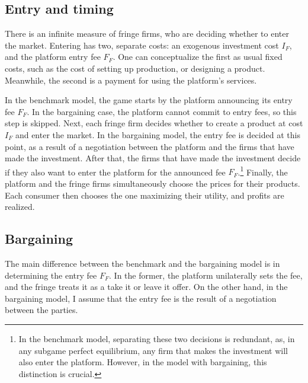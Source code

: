 \documentclass[a4paper]{article}
\begin{document}
\subsection{Entry and timing}

There is an infinite measure of fringe firms, who are deciding whether to enter the market.
Entering has two, separate costs: an exogenous investment cost $I_F$, and the platform entry fee $F_F$.
One can conceptualize the first as usual fixed costs, such as the cost of setting up production, or designing a product.
Meanwhile, the second is a payment for using the platform's services.

In the benchmark model, the game starts by the platform announcing its entry fee $F_F$.
In the bargaining case, the platform cannot commit to entry fees, so this step is skipped.
Next, each fringe firm decides whether to create a product at cost $I_F$ and enter the market.
In the bargaining model, the entry fee is decided at this point, as a result of a negotiation between the platform and the firms that have made the investment.
After that, the firms that have made the investment decide if they also want to enter the platform for the announced fee $F_F$.\footnote{
    In the benchmark model, separating these two decisions is redundant, as, in any subgame perfect equilibrium, any firm that makes the investment will also enter the platform.
    However, in the model with bargaining, this distinction is crucial.
}
Finally, the platform and the fringe firms simultaneously choose the prices for their products.
Each consumer then chooses the one maximizing their utility, and profits are realized.

\subsection{Bargaining}

The main difference between the benchmark and the bargaining model is in determining the entry fee $F_F$.
In the former, the platform unilaterally sets the fee, and the fringe treats it as a take it or leave it offer.
On the other hand, in the bargaining model, I assume that the entry fee is the result of a negotiation between the parties.
\end{document}
